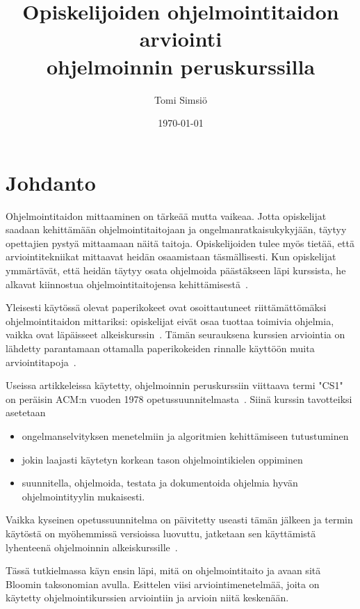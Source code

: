 \documentclass[finnish]{../tktltiki2}
\title{Opiskelijoiden ohjelmointitaidon arviointi \texorpdfstring{\\}{}ohjelmoinnin peruskurssilla}
\author{Tomi Simsiö}
\date{\today}
\theoremstyle{definition}
\theoremstyle{remark}
\begin{document}

\maketitle
\thispagestyle{empty}
\tableofcontents
\newpage
{}


\section{Johdanto}

Ohjelmointitaidon mittaaminen on tärkeää mutta vaikeaa. Jotta opiskelijat saadaan kehittämään ohjelmointitaitojaan ja ongelmanratkaisukykyjään, täytyy opettajien pystyä mittaamaan näitä taitoja. Opiskelijoiden tulee myös tietää, että arviointitekniikat mittaavat heidän osaamistaan täsmällisesti. Kun opiskelijat ymmärtävät, että heidän täytyy osata ohjelmoida päästäkseen läpi kurssista, he alkavat kiinnostua ohjelmointitaitojensa kehittämisestä~\cite{DW04}.

Yleisesti käytössä olevat paperikokeet ovat osoittautuneet riittämättö\-mäksi ohjelmointitaidon mittariksi: opiskelijat eivät osaa tuottaa toimivia ohjelmia, vaikka ovat läpäisseet alkeiskurssin~\cite{MAD01}. Tämän seurauksena kurssien arviointia on lähdetty parantamaan ottamalla paperikokeiden rinnalle käyttöön muita arviointitapoja~\cite{CJ01, CG02, WM03}.

Useissa artikkeleissa käytetty, ohjelmoinnin peruskurssiin viittaava termi "CS1" on peräisin ACM:n vuoden 1978 opetussuunnitelmasta~\cite{ACM78}. Siinä kurssin tavotteiksi asetetaan
\begin{itemize}
  \item ongelmanselvityksen menetelmiin ja algoritmien kehittämiseen tutustuminen
  \item jokin laajasti käytetyn korkean tason ohjelmointikielen oppiminen
  \item suunnitella, ohjelmoida, testata ja dokumentoida ohjelmia hyvän ohjelmointityylin mukaisesti.
\end{itemize}
Vaikka kyseinen opetussuunnitelma on päivitetty useasti tämän jälkeen ja termin käytöstä on myöhemmissä versioissa luovuttu, jatketaan sen käyttämistä lyhenteenä ohjelmoinnin alkeiskurssille~\cite{H10}.

Tässä tutkielmassa käyn ensin läpi, mitä on ohjelmointitaito ja avaan sitä Bloomin taksonomian avulla. Esittelen viisi arviointimenetelmää, joita on käytetty ohjelmointikurssien arviointiin ja arvioin niitä keskenään.
\end{document}
